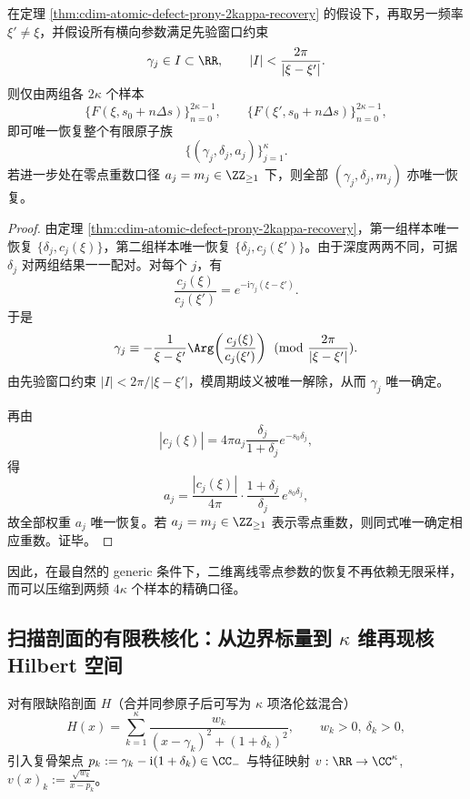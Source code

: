 \begin{theorem}\label{thm:cdim-atomic-defect-two-frequency-4kappa-recovery}
在定理 \ref{thm:cdim-atomic-defect-prony-2kappa-recovery} 的假设下，再取另一频率 \(\xi'\neq \xi\)，并假设所有横向参数满足先验窗口约束
\[
\gamma_j\in I\subset\RR,
\qquad
|I|<\frac{2\pi}{|\xi-\xi'|}.
\]
则仅由两组各 \(2\kappa\) 个样本
\[
\{F(\xi,s_0+n\Delta s)\}_{n=0}^{2\kappa-1},
\qquad
\{F(\xi',s_0+n\Delta s)\}_{n=0}^{2\kappa-1},
\]
即可唯一恢复整个有限原子族
\[
\{(\gamma_j,\delta_j,a_j)\}_{j=1}^{\kappa}.
\]
若进一步处在零点重数口径 \(a_j=m_j\in\ZZ_{\ge 1}\) 下，则全部 \((\gamma_j,\delta_j,m_j)\) 亦唯一恢复。
\end{theorem}
\begin{proof}
由定理 \ref{thm:cdim-atomic-defect-prony-2kappa-recovery}，第一组样本唯一恢复 \(\{\delta_j,c_j(\xi)\}\)，第二组样本唯一恢复 \(\{\delta_j,c_j(\xi')\}\)。由于深度两两不同，可据 \(\delta_j\) 对两组结果一一配对。对每个 \(j\)，有
\[
\frac{c_j(\xi)}{c_j(\xi')}
=
e^{-\mathrm{i}\gamma_j(\xi-\xi')}.
\]
于是
\[
\gamma_j
\equiv
-\frac{1}{\xi-\xi'}\Arg\!\left(\frac{c_j(\xi)}{c_j(\xi')}\right)
\pmod{\frac{2\pi}{|\xi-\xi'|}}.
\]
由先验窗口约束 \(|I|<2\pi/|\xi-\xi'|\)，模周期歧义被唯一解除，从而 \(\gamma_j\) 唯一确定。
\par
再由
\[
|c_j(\xi)|=4\pi a_j\frac{\delta_j}{1+\delta_j}e^{-s_0\delta_j},
\]
得
\[
a_j=
\frac{|c_j(\xi)|}{4\pi}\cdot \frac{1+\delta_j}{\delta_j}\,e^{s_0\delta_j},
\]
故全部权重 \(a_j\) 唯一恢复。若 \(a_j=m_j\in\ZZ_{\ge 1}\) 表示零点重数，则同式唯一确定相应重数。证毕。
\end{proof}
因此，在最自然的 generic 条件下，二维离线零点参数的恢复不再依赖无限采样，而可以压缩到两频 \(4\kappa\) 个样本的精确口径。

\subsection{扫描剖面的有限秩核化：从边界标量到 \texorpdfstring{$\kappa$}{kappa} 维再现核 Hilbert 空间}\label{subsec:cdim-scan-profile-finite-rank-rkhs}
对有限缺陷剖面 \(H\)（合并同参原子后可写为 \(\kappa\) 项洛伦兹混合）
\[
H(x)=\sum_{k=1}^{\kappa}\frac{w_k}{(x-\gamma_k)^2+(1+\delta_k)^2},
\qquad
w_k>0,\ \delta_k>0,
\]
引入复骨架点
\(
p_k:=\gamma_k-\mathrm{i}(1+\delta_k)\in\CC_{-}
\)
与特征映射
\(
v:\RR\to\CC^\kappa
\),
\(
v(x)_k:=\frac{\sqrt{w_k}}{x-p_k}
\)。


